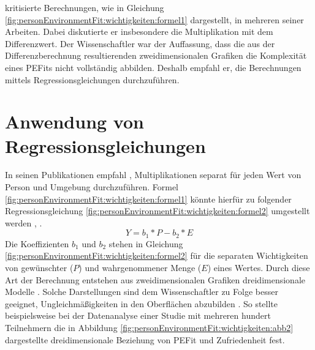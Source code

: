 \textcite[S. 51ff.]{edwards:1991}\cite[S. 9ff.]{edwards:1990}\cite[S. 2ff.]{edwards:1993}\cite[S. 2ff.]{edwards:1993b} kritisierte Berechnungen, wie in Gleichung \ref{fig:personEnvironmentFit:wichtigkeiten:formel1} dargestellt, in mehreren seiner Arbeiten. Dabei diskutierte er insbesondere die Multiplikation mit dem Differenzwert. Der Wissenschaftler war der Auffassung, dass die aus der Differenzberechnung resultierenden zweidimensionalen Grafiken die Komplexität eines \acp{PEFit} nicht vollständig abbilden. Deshalb empfahl er, die Berechnungen mittels Regressionsgleichungen durchzuführen.

\section{Anwendung von Regressionsgleichungen}
\label{ch:personEnvironmentFit:regressionsgleichungen}
In seinen Publikationen empfahl \textcite[S. 51ff.]{edwards:1991}\cite[S. 9ff.]{edwards:1990}\cite[S. 2ff.]{edwards:1993}\cite[S. 2ff.]{edwards:1993b}, Multiplikationen separat für jeden Wert von Person und Umgebung durchzuführen. Formel \ref{fig:personEnvironmentFit:wichtigkeiten:formel1} könnte hierfür zu folgender Regressionsgleichung \ref{fig:personEnvironmentFit:wichtigkeiten:formel2} umgestellt werden \cite[S. 9f.]{edwards:1990}, \cite[S. 2f.]{edwards:1993b}.
\begin{equation}
	Y = b_1 * P - b_2 * E
	\label{fig:personEnvironmentFit:wichtigkeiten:formel2}
\end{equation}
Die Koeffizienten $b_1$ und $b_2$ stehen in Gleichung \ref{fig:personEnvironmentFit:wichtigkeiten:formel2} für die separaten Wichtigkeiten von gewünschter ($P$) und wahrgenommener Menge ($E$) eines Wertes. Durch diese Art der Berechnung entstehen aus zweidimensionalen Grafiken dreidimensionale Modelle \cite[S. 2]{edwards:1993}. Solche Darstellungen sind dem Wissenschaftler zu Folge besser geeignet, Ungleichmäßigkeiten in den Oberflächen abzubilden \cite[S. 51ff.]{edwards:1991}. So stellte \textcite[S. 53ff.]{edwards:1991} beispielsweise bei der Datenanalyse einer Studie mit mehreren hundert Teilnehmern die in Abbildung \ref{fig:personEnvironmentFit:wichtigkeiten:abb2} dargestellte dreidimensionale Beziehung von \ac{PEFit} und Zufriedenheit fest.


